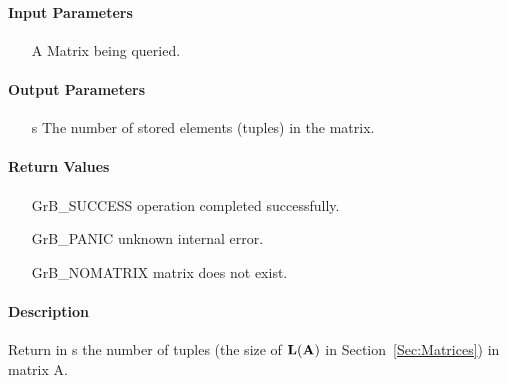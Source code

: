 \paragraph{Input Parameters}

\begin{itemize}[leftmargin=1.1in]
    \item[{\sf A}] Matrix being queried.
\end{itemize}

\paragraph{Output Parameters}
\begin{itemize}[leftmargin=1.1in]
    \item[{\sf s}] The number of stored elements (tuples) in the matrix.
\end{itemize}

\paragraph{Return Values}

\begin{itemize}[leftmargin=2.1in]
\item[{\sf GrB\_SUCCESS}]   operation completed successfully.
\item[{\sf GrB\_PANIC}]     unknown internal error.
\item[{\sf GrB\_NOMATRIX}]  matrix does not exist.
\end{itemize}

\paragraph{Description}

Return in {\sf s} the number of tuples (the size of $\bold{L}({\bf A})$
in Section~\ref{Sec:Matrices}) in matrix {\sf A}.

